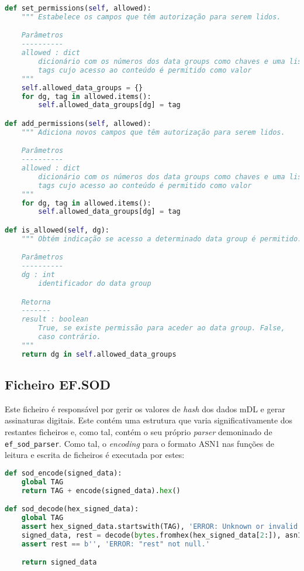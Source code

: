 \begin{lstlisting}[caption=API de acesso ao EF.GroupAccess, language=Python]
    def set_permissions(self, allowed):
    """ Estabelece os campos que têm autorização para serem lidos.

    Parâmetros
    ----------
    allowed : dict
        dicionário com os números dos data groups como chaves e uma lista das
        tags cujo acesso ao conteúdo é permitido como valor
    """
    self.allowed_data_groups = {}
    for dg, tag in allowed.items():
        self.allowed_data_groups[dg] = tag

def add_permissions(self, allowed):
    """ Adiciona novos campos que têm autorização para serem lidos.

    Parâmetros
    ----------
    allowed : dict
        dicionário com os números dos data groups como chaves e uma lista das
        tags cujo acesso ao conteúdo é permitido como valor
    """
    for dg, tag in allowed.items():
        self.allowed_data_groups[dg] = tag

def is_allowed(self, dg):
    """ Obtém indicação se acesso a determinado data group é permitido.

    Parâmetros
    ----------
    dg : int
        identificador do data group

    Retorna
    -------
    result : boolean
        True, se existe permissão para aceder ao data group. False,
        caso contrário.
    """
    return dg in self.allowed_data_groups
\end{lstlisting}


\subsection{Ficheiro EF.SOD}

Este ficheiro é responsável por gerir os valores de \textit{hash} dos dados mDL e gerar assinaturas digitais. Este contém uma estrutura que varia significativamente dos restantes ficheiros e, como tal, contém o seu próprio \textit{parser} demoninado de \texttt{ef_sod_parser}. Como tal, o \textit{encoding} para o formato ASN1 nas funções de leitura e escrita de ficheiros é executada por estes:

\begin{lstlisting}[caption=Formatação de dados para o ficheiro EF.SOD, language=Python]
def sod_encode(signed_data):
    global TAG
    return TAG + encode(signed_data).hex()

def sod_decode(hex_signed_data):
    global TAG
    assert hex_signed_data.startswith(TAG), 'ERROR: Unknown or invalid tag.'
    signed_data, rest = decode(bytes.fromhex(hex_signed_data[2:]), asn1Spec=SignedData())
    assert rest == b'', 'ERROR: "rest" not null.'

    return signed_data
\end{lstlisting}

